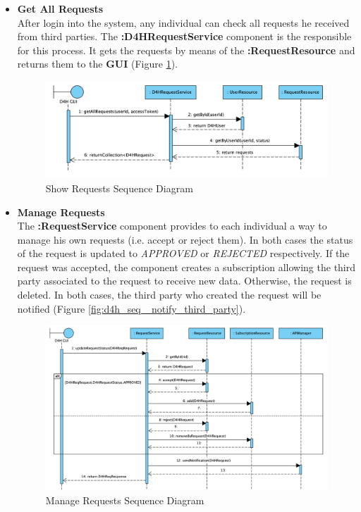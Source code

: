 \documentclass[a4paper, hidelinks, 12pt]{report}
\begin{document}
\begin{itemize}
	\item \textbf{Get All Requests} \\
	After login into the system, any individual can check all requests he received from third parties. The \textbf{:D4HRequestService} component is the responsible for this process.  It gets the requests by means of the \textbf{:RequestResource} and returns them to the \textbf{GUI} (Figure \ref{fig:d4h_seq_show_requests}). \\
	
	\begin{figure}[H]
		\centering
		\includegraphics[width=1\textwidth]{diagrams/sequence_diagrams/d4h_show_requests.png}
		\caption[Show Requests Sequence Diagram]{Show Requests Sequence Diagram}
		\label{fig:d4h_seq_show_requests}
	\end{figure}
	
	\item \textbf{Manage Requests} \\
	The \textbf{:RequestService} component provides to each individual a way to manage his own requests (i.e. accept or reject them). In both cases the status of the request is updated to \textit{APPROVED} or \textit{REJECTED} respectively. If the request was accepted, the component creates a subscription allowing the third party associated to the request to receive new data. Otherwise, the request is deleted. In both cases, the third party who created the request will be notified (Figure \ref{fig:d4h_seq_ notify_third_party}). \\
	
	\begin{figure}[H]
		\centering
		\includegraphics[width=1.1\textwidth]{diagrams/sequence_diagrams/d4h_manage_requests.png}
		\caption[Manage Requests Sequence Diagram]{Manage Requests Sequence Diagram}
		\label{fig:d4h_seq_manage_requests}
	\end{figure}


\end{itemize}
\end{document}
